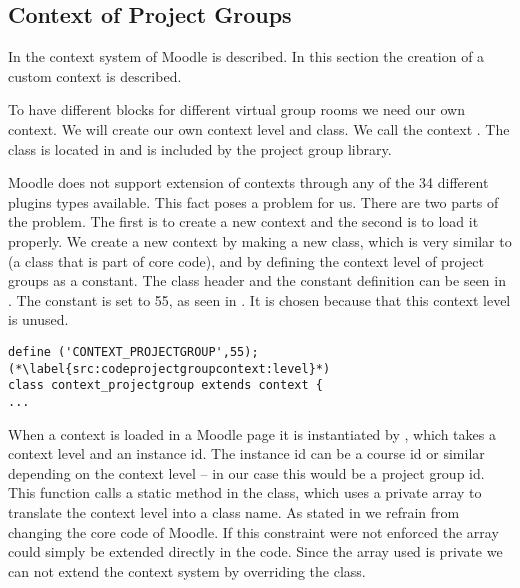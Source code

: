 \subsection{Context of Project Groups}
In   the context system of Moodle is described.
In this section the creation of a custom context is described. 

To have different blocks for different virtual group rooms we need our own context.
We will create our own context level and class.
We call the context . 
The class is located in  and is included by the project group library. 

Moodle does not support extension of contexts through any of the 34 different plugins types available. 
This fact poses a problem for us.
There are two parts of the problem.
The first is to create a new context and the second is to load it properly. 
We create a new context by making a new class, which is very similar to  (a class that is part of \moodle{} core code), and by defining the context level of project groups as a constant. 
The class header and the constant definition can be seen in . 
The constant is set to 55, as seen in .
It is chosen because that this context level is unused.

\begin{lstlisting}[style=phpCode, caption=\myCaption{The context\_projectgroup class header and constant definition}, label=src:codeprojectgroupcontext]
define ('CONTEXT_PROJECTGROUP',55); (*\label{src:codeprojectgroupcontext:level}*)
class context_projectgroup extends context {
...
\end{lstlisting}

When a context is loaded in a Moodle page it is instantiated by , which takes a context level and an instance id. 
The instance id can be a course id or similar depending on the context level -- in our case this would be a project group id. 
This function calls a static method in the  class, which uses a private array to translate the context level into a class name.
As stated in  we refrain from changing the core code of Moodle. 
If this constraint were not enforced the array could simply be extended directly in the code.  
Since the array used is private we can not extend the context system by overriding the  class. 

